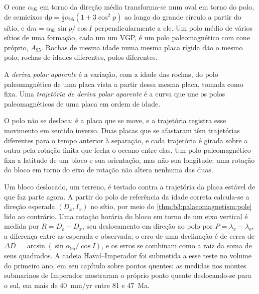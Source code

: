 O cone $\alpha_{95}$ em torno da direção média transforma-se num oval em torno do polo,
de semieixos $\mathrm dp = \tfrac12\alpha_{95}(1 + 3\cos^2p)$ ao longo do grande
círculo a partir do sítio, e $\mathrm dm = \alpha_{95}\sin p/\cos I$ perpendicularmente a ele. Um
polo médio de vários sítios de uma formação, cada um um VGP, é um polo paleomagnético com
cone próprio, $A_{95}$. Rochas de mesma idade numa mesma placa rígida dão o
mesmo polo; rochas de idades diferentes, polos diferentes.

\begin{definition}\label{def:b3:palaeomagnetism:apw}
A \emph{deriva polar aparente} é a variação, com a idade das rochas,
do polo paleomagnético de uma placa vista a partir dessa mesma placa, tomada como fixa.
Uma \emph{trajetória de deriva polar aparente}
é a curva que une os polos paleomagnéticos de uma placa em ordem
de idade.
\end{definition}

O polo não se desloca: é a placa que se move, e a trajetória registra esse movimento em
sentido inverso. Duas placas que se afastaram têm trajetórias diferentes para o tempo
anterior à separação, e cada trajetória é girada sobre a outra pela rotação finita
que fecha o oceano entre elas. Um polo paleomagnético fixa a
latitude de um bloco e sua orientação, mas não sua longitude: uma rotação do
bloco em torno do eixo de rotação não altera nenhuma das duas.

Um bloco deslocado, um terreno, é testado contra a trajetória da placa estável de
que faz parte agora. A partir do polo de referência da idade correta calcula-se a
direção esperada $(D_x, I_x)$ no sítio, por meio do \cref{thm:b3:palaeomagnetism:pole}
lido ao contrário. Uma rotação horária do bloco em torno de um eixo vertical é
medida por $R = D_o - D_x$, seu deslocamento em direção ao polo por $P = \lambda_x -
\lambda_o$, a diferença entre as  esperada e observada; o
erro de uma declinação é de cerca de $\Delta D = \arcsin(\sin\alpha_{95}/\cos I)$,
e os erros se combinam como a raiz da soma de seus quadrados. A cadeia Havaí--Imperador
foi submetida a esse teste no volume do primeiro ano, em seu capítulo sobre pontos quentes:
as  medidas nos montes submarinos de Imperador mostraram o próprio ponto quente
deslocando-se para o sul, em mais de \qty{40}{mm/yr} entre 81 e \qty{47}{Ma}.


